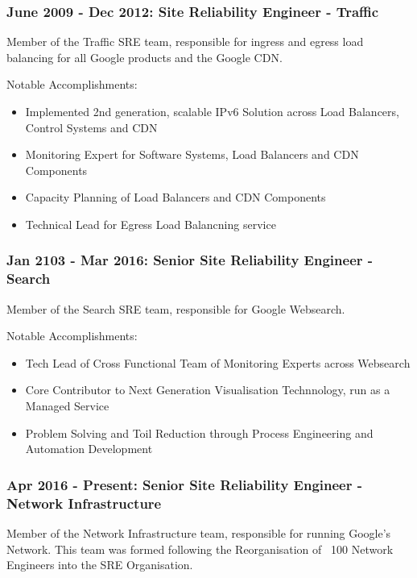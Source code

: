 \documentclass[a4paper, 10pt] {article}
\begin{document}
\subsubsection*{June 2009 - Dec 2012: Site Reliability Engineer - Traffic}

Member of the Traffic SRE team, responsible for ingress and egress load balancing for all Google products and the Google CDN.

Notable Accomplishments:

\begin{itemize}
  \item Implemented 2nd generation, scalable IPv6 Solution across Load Balancers, Control Systems and CDN
  \item Monitoring Expert for Software Systems, Load Balancers and CDN Components 
  \item Capacity Planning of Load Balancers and CDN Components
  \item Technical Lead for Egress Load Balancning service
\end{itemize}

\subsubsection*{Jan 2103 - Mar 2016: Senior Site Reliability Engineer - Search}

Member of the Search SRE team, responsible for Google Websearch.

Notable Accomplishments:

\begin{itemize}
  \item Tech Lead of Cross Functional Team of Monitoring Experts across Websearch
  \item Core Contributor to Next Generation Visualisation Technnology, run as a Managed Service
  \item Problem Solving and Toil Reduction through Process Engineering and Automation Development
\end{itemize}

\subsubsection*{Apr 2016 - Present: Senior Site Reliability Engineer - Network Infrastructure}

Member of the Network Infrastructure team, responsible for running Google's Network. This team was formed
following the Reorganisation of ~100 Network Engineers into the SRE Organisation.
\end{document}
